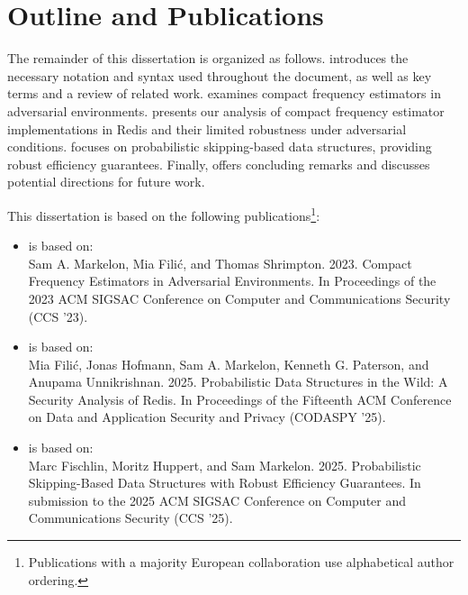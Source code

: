 \section{Outline and Publications}

The remainder of this dissertation is organized as follows.  introduces the necessary notation and syntax used throughout the document, as well as key terms and a review of related work.  examines compact frequency estimators in adversarial environments.  presents our analysis of compact frequency estimator implementations in Redis and their limited robustness under adversarial conditions.  focuses on probabilistic skipping-based data structures, providing robust efficiency guarantees. Finally,  offers concluding remarks and discusses potential directions for future work.

This dissertation is based on the following publications\footnote{Publications with a majority European collaboration use alphabetical author ordering.}:

\begin{itemize}
    \item {} is based on:\\
    Sam A. Markelon, Mia Filić, and Thomas Shrimpton. 2023. Compact Frequency Estimators in Adversarial Environments. In Proceedings of the 2023 ACM SIGSAC Conference on Computer and Communications Security (CCS '23).

    \item {} is based on:\\
    Mia Filić, Jonas Hofmann, Sam A. Markelon, Kenneth G. Paterson, and Anupama Unnikrishnan. 2025. Probabilistic Data Structures in the Wild: A Security Analysis of Redis. In Proceedings of the Fifteenth ACM Conference on Data and Application Security and Privacy (CODASPY '25).

    \item {} is based on:\\
    Marc Fischlin, Moritz Huppert, and Sam Markelon. 2025. Probabilistic Skipping-Based Data Structures with Robust Efficiency Guarantees. In submission to the 2025 ACM SIGSAC Conference on Computer and Communications Security (CCS '25).
\end{itemize}